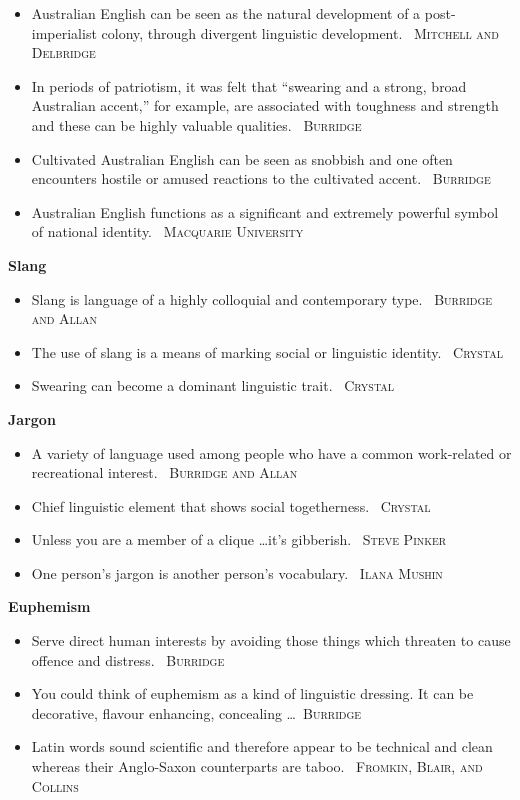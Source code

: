 \documentclass[10pt, a4paper]{article}
\newcommand{\heading}[1]{\textbf{#1}}
\newcommand{\linguist}[1]{\textemdash~\textsc{#1}}
\begin{document}
\begin{multicols}{2}
\begin{itemize}
    \item Australian English can be seen as the natural development of a post-imperialist colony, through divergent linguistic development. \linguist{Mitchell and Delbridge}
    \item In periods of patriotism, it was felt that ``swearing and a strong, broad Australian accent,'' for example, are associated with toughness and strength and these can be highly valuable qualities. \linguist{Burridge}
    \item Cultivated Australian English can be seen as snobbish and one often encounters hostile or amused reactions to the cultivated accent. \linguist{Burridge}
    \item Australian English functions as a significant and extremely powerful symbol of national identity. \linguist{Macquarie University}
  \end{itemize}
  \heading{Slang}
  \begin{itemize}
    \item Slang is language of a highly colloquial and contemporary type. \linguist{Burridge and Allan}
    \item The use of slang is a means of marking social or linguistic identity. \linguist{Crystal}
    \item Swearing can become a dominant linguistic trait. \linguist{Crystal}
  \end{itemize}
  \heading{Jargon}
  \begin{itemize}
    \item A variety of language used among people who have a common work-related or recreational interest. \linguist{Burridge and Allan}
    \item Chief linguistic element that shows social togetherness. \linguist{Crystal}
    \item Unless you are a member of a clique \dots it's gibberish. \linguist{Steve Pinker}
    \item One person's jargon is another person's vocabulary. \linguist{Ilana Mushin}
  \end{itemize}
  \heading{Euphemism}
  \begin{itemize}
    \item Serve direct human interests by avoiding those things which threaten to  cause offence and distress. \linguist{Burridge}
    \item You could think of euphemism as a kind of linguistic dressing. It can be decorative, flavour enhancing, concealing \dots \linguist{Burridge}
    \item Latin words sound scientific and therefore appear to be technical and clean whereas their Anglo-Saxon counterparts are taboo. \linguist{Fromkin, Blair, and Collins}

\end{itemize}
\end{multicols}
\end{document}

